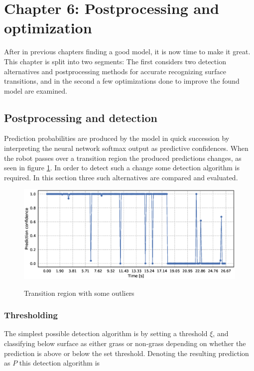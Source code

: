 \section{Chapter 6: Postprocessing and optimization}

After in previous chapters finding a good model, it is now time to make it great. This chapter is split into two segments: The first considers two detection alternatives and postprocessing methods for accurate recognizing surface transitions, and in the second a few optimizations done to improve the found model are examined.

\subsection{Postprocessing and detection}

Prediction probabilities are produced by the model in quick succession by interpreting the neural network softmax output as predictive confidences. When the robot passes over a transition region the produced predictions changes, as seen in figure \ref{fig:detect_no}. In order to detect such a change some detection algorithm is required. In this section three such alternatives are compared and evaluated.  


\begin{figure}
	\includegraphics[scale=0.5]{figs_temp/detect_nothing}
	\label{fig:detect_no}
	\caption{Transition region with some outliers}
\end{figure}

\subsubsection{Thresholding}

The simplest possible detection algorithm is by setting a threshold $\xi$, and classifying below surface as either grass or non-grass depending on whether the prediction is above or below the set threshold. Denoting the resulting prediction as $P$ this detection algorithm is 

